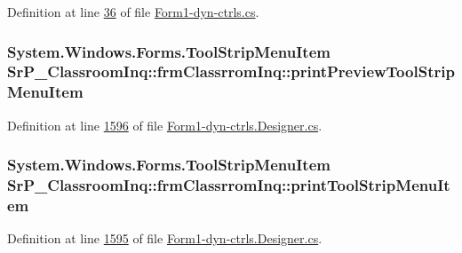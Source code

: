 \-Definition at line \hyperlink{_form1-dyn-ctrls_8cs_source_l00036}{36} of file \hyperlink{_form1-dyn-ctrls_8cs_source}{\-Form1-\/dyn-\/ctrls.\-cs}.

\hypertarget{class_sr_p___classroom_inq_1_1frm_classrrom_inq_a56c14d36b467c4787937369037c22717}{
\subsubsection[{print\-Preview\-Tool\-Strip\-Menu\-Item}]{\setlength{\rightskip}{0pt plus 5cm}\-System.\-Windows.\-Forms.\-Tool\-Strip\-Menu\-Item {\bf \-Sr\-P\-\_\-\-Classroom\-Inq\-::frm\-Classrrom\-Inq\-::print\-Preview\-Tool\-Strip\-Menu\-Item}}}
\label{class_sr_p___classroom_inq_1_1frm_classrrom_inq_a56c14d36b467c4787937369037c22717}


\-Definition at line \hyperlink{_form1-dyn-ctrls_8_designer_8cs_source_l01596}{1596} of file \hyperlink{_form1-dyn-ctrls_8_designer_8cs_source}{\-Form1-\/dyn-\/ctrls.\-Designer.\-cs}.

\hypertarget{class_sr_p___classroom_inq_1_1frm_classrrom_inq_ab2355ecf8174002162a103a7e7ee83f4}{
\subsubsection[{print\-Tool\-Strip\-Menu\-Item}]{\setlength{\rightskip}{0pt plus 5cm}\-System.\-Windows.\-Forms.\-Tool\-Strip\-Menu\-Item {\bf \-Sr\-P\-\_\-\-Classroom\-Inq\-::frm\-Classrrom\-Inq\-::print\-Tool\-Strip\-Menu\-Item}}}
\label{class_sr_p___classroom_inq_1_1frm_classrrom_inq_ab2355ecf8174002162a103a7e7ee83f4}


\-Definition at line \hyperlink{_form1-dyn-ctrls_8_designer_8cs_source_l01595}{1595} of file \hyperlink{_form1-dyn-ctrls_8_designer_8cs_source}{\-Form1-\/dyn-\/ctrls.\-Designer.\-cs}.


